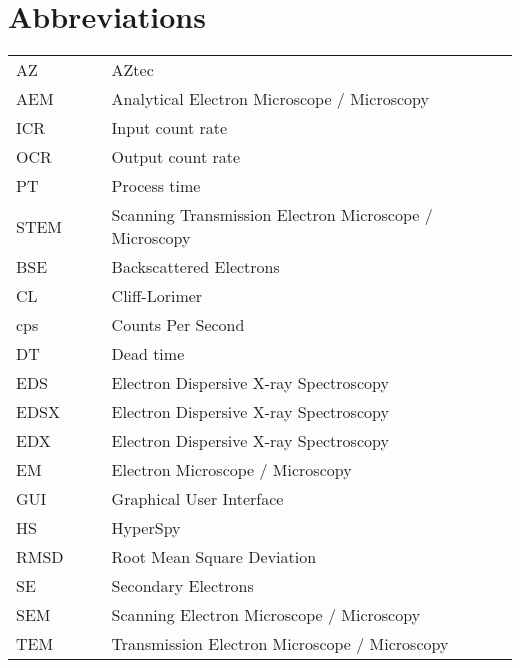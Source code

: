 \chapter*{Abbreviations}

\begin{table}[h!]
    \centering
    \begin{tabular}{llll}
        AZ   &  &  & AZtec                                                  \\
        AEM  &  &  & Analytical Electron Microscope / Microscopy            \\
        ICR  &  &  & Input count rate                                       \\
        OCR  &  &  & Output count rate                                      \\
        PT   &  &  & Process time                                           \\
        STEM &  &  & Scanning Transmission Electron Microscope / Microscopy \\
        BSE  &  &  & Backscattered Electrons                                \\
        CL   &  &  & Cliff-Lorimer                                          \\
        cps  &  &  & Counts Per Second                                      \\
        DT   &  &  & Dead time                                              \\
        EDS  &  &  & Electron Dispersive X-ray Spectroscopy                 \\
        EDSX &  &  & Electron Dispersive X-ray Spectroscopy                 \\
        EDX  &  &  & Electron Dispersive X-ray Spectroscopy                 \\
        EM   &  &  & Electron Microscope / Microscopy                       \\
        GUI  &  &  & Graphical User Interface                               \\
        HS   &  &  & HyperSpy                                               \\
        RMSD &  &  & Root Mean Square Deviation                             \\
        SE   &  &  & Secondary Electrons                                    \\
        SEM  &  &  & Scanning Electron Microscope / Microscopy              \\
        TEM  &  &  & Transmission Electron Microscope / Microscopy
    \end{tabular}
\end{table}

